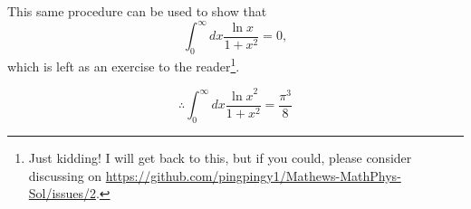 This same procedure can be used to show that
\[
    \int_0^\infty dx \frac{\ln x}{1 + x^2} = 0,
\]
which is left as an exercise to the reader\footnote{
Just kidding!
I will get back to this, but if you could, please consider discussing on \url{https://github.com/pingpingy1/Mathews-MathPhys-Sol/issues/2}.
}.

\[
	\therefore \int_0^\infty dx \frac{{\ln x}^2}{1 + x^2} = \frac{\pi^3}{8}
\]
